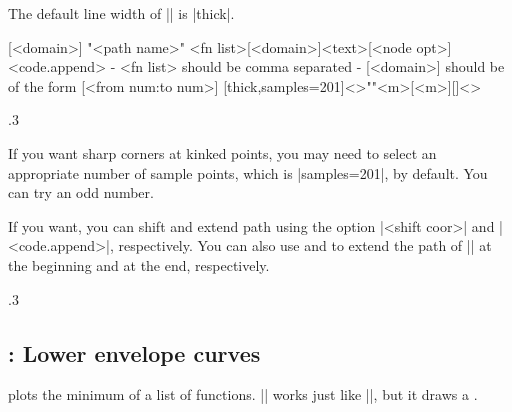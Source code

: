 The default line width of |\tzfnmax| is |thick|.

\begin{tzdef}{}
[<domain>]
"<path name>"
     {<fn list>}[<domain>]{<text>}[<node opt>]<code.append>
  - {<fn list>} should be comma separated
  - [<domain>] should be of the form [<from num:to num>]
  [thick,samples=201]<>""{<m>}[<m>]{}[]<>
\end{tzdef}


\begin{tzcode}{.3}
{}
\end{tzcode}

\remark If you want sharp corners at kinked points, you may need to select an appropriate number of sample points, which is |samples=201|, by default. You can try an odd number.
\remarkafterskip

If you want, you can shift and extend path using the option |<shift coor>| and |<code.append>|, respectively.
You can also use \icmd{\tzfnmaxAtBegin} and \icmd{\tzfnmaxAtEnd} to extend the path of |\tzfnmax| at the beginning and at the end, respectively.

\begin{tzcode}{.3}
\end{tzcode}


\subsection{\protect\cmd{\tzfnmin}: Lower envelope curves}
\label{ss:tzfnmin}

\icmd{\tzfnmin} plots the minimum of a list of functions. 
|\tzfnmin| works just like |\tzfnmax|, but it draws  a .

